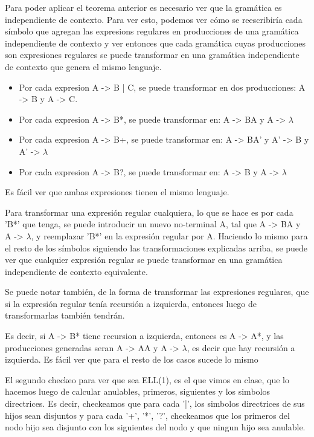 \documentclass[a4paper]{report}
\begin{document}
Para poder aplicar el teorema anterior es necesario ver que la gramática es
independiente de contexto. Para ver esto, podemos ver cómo se reescribiría cada
símbolo que agregan las expresions regulares en producciones de una gramática
independiente de contexto y ver entonces que cada gramática cuyas producciones
son expresiones regulares se puede transformar en una gramática independiente de
contexto que genera el mismo lenguaje.

\begin{itemize}
\item Por cada expresion A -> B | C, se puede transformar en dos producciones: A -> B
y A -> C.
\item Por cada expresion A -> B*, se puede transformar en: A -> BA y A -> $\lambda$
\item Por cada expresion A -> B+, se puede transformar en: A -> BA' y A' -> B y A' -> $\lambda$
\item Por cada expresion A -> B?, se puede transformar en: A -> B y A -> $\lambda$
\end{itemize}


Es fácil ver que ambas expresiones tienen el mismo lenguaje.


Para transformar una expresión regular cualquiera, lo que se hace es por cada
'B*' que tenga, se puede introducir un nuevo no-terminal A, tal que A -> BA y A
-> $\lambda$, y reemplazar 'B*' en la expresión regular por A. Haciendo lo mismo para el
resto de los símbolos siguiendo las transformaciones explicadas arriba, se puede
ver que cualquier expresión regular se puede transformar en una gramática
independiente de contexto equivalente.


Se puede notar también, de la forma de transformar las expresiones regulares,
que si la expresión regular tenía recursión a izquierda, entonces luego de
transformarlas también tendrán.


Es decir, si A -> B* tiene recursion a izquierda, entonces es A -> A*, y las
producciones generadas seran A -> AA y A -> $\lambda$, es decir que hay recursión a
izquierda. Es fácil ver que para el resto de los casos sucede lo mismo


El segundo checkeo para ver que sea ELL(1), es el que vimos en clase, que lo
hacemos luego de calcular anulables, primeros, siguientes y los simbolos
directrices. Es decir, checkeamos que para cada '|', los simbolos directrices de
sus hijos sean disjuntos y para cada '+', '*', '?', checkeamos que los primeros
del nodo hijo sea disjunto con los siguientes del nodo y que ningun hijo sea
anulable.
\end{document}
